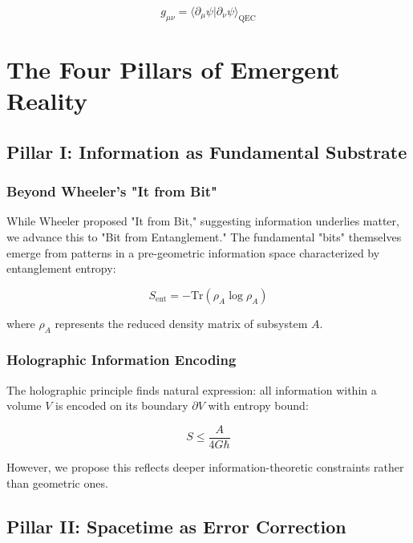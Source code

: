 \documentclass[12pt]{article}
\begin{document}
\begin{equation}
g_{\mu\nu} = \langle\partial_\mu \psi | \partial_\nu \psi\rangle_{\text{QEC}}
\end{equation}

\section{The Four Pillars of Emergent Reality}

\subsection{Pillar I: Information as Fundamental Substrate}

\subsubsection{Beyond Wheeler's "It from Bit"}

While Wheeler proposed "It from Bit," suggesting information underlies matter, we advance this to "Bit from Entanglement." The fundamental "bits" themselves emerge from patterns in a pre-geometric information space characterized by entanglement entropy:

\begin{equation}
S_{\text{ent}} = -\text{Tr}(\rho_A \log \rho_A)
\end{equation}

where $\rho_A$ represents the reduced density matrix of subsystem $A$.

\subsubsection{Holographic Information Encoding}

The holographic principle finds natural expression: all information within a volume $V$ is encoded on its boundary $\partial V$ with entropy bound:

\begin{equation}
S \leq \frac{A}{4G\hbar}
\end{equation}

However, we propose this reflects deeper information-theoretic constraints rather than geometric ones.

\subsection{Pillar II: Spacetime as Error Correction}
\end{document}
